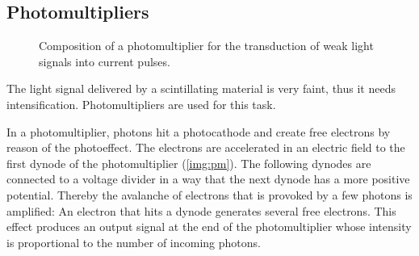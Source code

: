 \subsection{Photomultipliers}

\begin{figure}[H]
        \centering
        \def\svgwidth{0.52\textwidth}
       
        \caption{Composition of a photomultiplier for the transduction of weak light signals into current pulses.}
        \label{img:pm}
\end{figure}

The light signal delivered by a scintillating material is very faint, thus it needs intensification.
Photomultipliers are used for this task.

In a photomultiplier, photons hit a photocathode and create free electrons by reason of the photoeffect.
The electrons are accelerated in an electric field to the first dynode of the photomultiplier (\autoref{img:pm}).
The following dynodes are connected to a voltage divider in a way that the next dynode has a more positive potential.
Thereby the avalanche of electrons that is provoked by a few photons is amplified:
An electron that hits a dynode generates several free electrons.
This effect produces an output signal at the end of the photomultiplier whose intensity is proportional
to the number of incoming photons.

